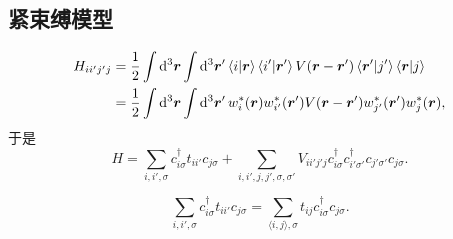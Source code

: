 \documentclass[hyperref, UTF8, a4paper]{ctexart}
\newcommand*{\pair}[1]{\langle #1 \rangle}
\begin{document}
\subsection{紧束缚模型}

\begin{equation}
    \begin{aligned}
        H_{i i' j' j} &= \frac{1}{2} \int \dd[3]{\vb*{r}} \int \dd[3]{\vb*{r}'} \braket{i}{\vb*{r}} \braket{i'}{\vb*{r}'} V(\vb*{r} - \vb*{r}') \braket{\vb*{r}'}{j'} \braket{\vb*{r}}{j} \\
        &= \frac{1}{2} \int \dd[3]{\vb*{r}} \int \dd[3]{\vb*{r}'} w_i^*(\vb*{r}) w_{i'}^*(\vb*{r}') V(\vb*{r} - \vb*{r}') w_{j'}^*(\vb*{r}') w_j^*(\vb*{r}),
    \end{aligned}
    \label{eq:wannier-basis-interaction}
\end{equation}
于是
\begin{equation}
    H = \sum_{i, i', \sigma} c^\dagger_{i \sigma} t_{i i'} c_{j \sigma} + \sum_{i, i', j, j', \sigma, \sigma'} V_{i i' j' j} c^\dagger_{i \sigma} c^\dagger_{i' \sigma'} c_{j' \sigma'} c_{j \sigma}.
\end{equation}

\[
    \sum_{i, i', \sigma} c^\dagger_{i \sigma} t_{i i'} c_{j \sigma} = \sum_{\pair{i, j}, \sigma} t_{ij} c^\dagger_{i \sigma} c_{j \sigma}.
\]
\end{document}
